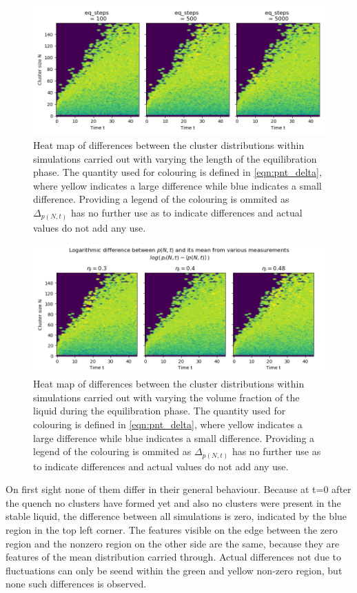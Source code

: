 \begin{figure}[h!]
\centering
\includegraphics[width=0.7 \linewidth]{../plots/pnt_comparison_eq_steps.png}
\caption{Heat map of differences between the cluster distributions within simulations carried out with varying the length of the equilibration phase. The quantity used for colouring is defined in \autoref{eqn:pnt_delta}, where yellow indicates a large difference while blue indicates a small difference. Providing a legend of the colouring is ommited as $\Delta_{p(N,t)}$ has no further use as to indicate differences and actual values do not add any use.}
\label{fig:pnt_eq_step_comparison}
\end{figure}


\begin{figure}[h!]
\centering
\includegraphics[width=0.7 \linewidth]{../plots/pnt_comparison_rho.png}
\caption{Heat map of differences between the cluster distributions within simulations carried out with varying the volume fraction of the liquid during the equilibration phase. The quantity used for colouring is defined in \autoref{eqn:pnt_delta}, where yellow indicates a large difference while blue indicates a small difference. Providing a legend of the colouring is ommited as $\Delta_{p(N,t)}$ has no further use as to indicate differences and actual values do not add any use.}
\label{fig:pnt_rho_comparison}
\end{figure}

On first sight none of them differ in their general behaviour. Because at t=0 after the quench no clusters have formed yet and also no clusters were present in the stable liquid, the difference between all simulations is zero, indicated by the blue region in the top left corner. The features visible on the edge between the zero region and the nonzero region on the other side are the same, because they are features of the mean distribution carried through. Actual differences not due to fluctuations can only be seend within the green and yellow non-zero region, but none such differences is observed.\\

